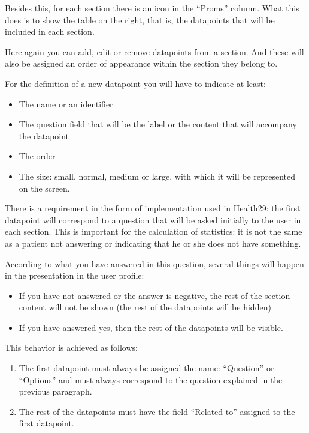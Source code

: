 \documentclass[letterpaper,10pt,english]{sphinxmanual}
\begin{document}
Besides this, for each section there is an icon in the “Proms” column. What this does is to show the table on the right, that is, the datapoints that will be included in each section.

Here again you can add, edit or remove datapoints from a section. And these will also be assigned an order of appearance within the section they belong to.

For the definition of a new datapoint you will have to indicate at least:
\begin{itemize}
\item {} 
The name or an identifier

\item {} 
The question field that will be the label or the content that will accompany the datapoint

\item {} 
The order

\item {} 
The size: small, normal, medium or large, with which it will be represented on the screen.

\end{itemize}

There is a requirement in the form of implementation used in Health29: the first datapoint will correspond to a question that will be asked initially to the user in each section. This is important for the calculation of statistics: it is not the same as a patient not answering or indicating that he or she does not have something.

According to what you have answered in this question, several things will happen in the presentation in the user profile:
\begin{itemize}
\item {} 
If you have not answered or the answer is negative, the rest of the section content will not be shown (the rest of the datapoints will be hidden)

\item {} 
If you have answered yes, then the rest of the datapoints will be visible.

\end{itemize}

This behavior is achieved as follows:
\begin{enumerate}
%
\item {} 
The first datapoint must always be assigned the name: “Question” or “Options” and must always correspond to the question explained in the previous paragraph.

\item {} 
The rest of the datapoints must have the field “Related to” assigned to the first datapoint.

\end{enumerate}
\end{document}
